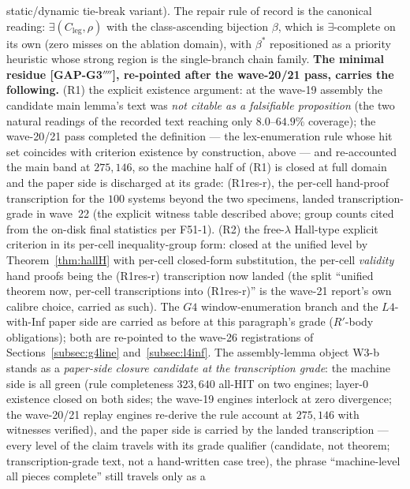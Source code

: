 static/dynamic tie-break variant). The repair rule of record is the canonical reading:
$\exists(C_{\mathrm{leg}},\rho)$ with the class-ascending bijection $\beta$, which is
$\exists$-complete on its own (zero misses on the ablation domain), with $\beta^\ast$
repositioned as a priority heuristic whose strong region is the single-branch chain
family. \textbf{The minimal residue \textup{[GAP-G3$''''$]}, re-pointed after the wave-20/21
pass, carries the following.} \textup{(R1)} the explicit existence argument: at the
wave-19 assembly the candidate main lemma's text was \emph{not citable as a falsifiable
proposition} (the two natural readings of the recorded text reaching only
$8.0$--$64.9\%$ coverage); the wave-20/21 pass completed the definition --- the
lex-enumeration rule whose hit set coincides with criterion existence by construction,
above --- and re-accounted the main band at $275{,}146$, so the machine half of
\textup{(R1)} is closed at full domain and the paper side is discharged at its grade:
\textup{(R1res-r)}, the per-cell hand-proof transcription for the $100$ systems beyond
the two specimens, landed transcription-grade in wave~22 (the explicit witness table
described above; group counts cited from the on-disk final statistics per F51-1).
\textup{(R2)} the free-$\lambda$ Hall-type explicit criterion in its per-cell
inequality-group form: closed at the unified level by Theorem~\ref{thm:hallH} with
per-cell closed-form substitution, the per-cell \emph{validity} hand proofs being the
\textup{(R1res-r)} transcription now landed (the split ``unified theorem now, per-cell
transcriptions into \textup{(R1res-r)}'' is the wave-21 report's own calibre choice,
carried as such). The $G4$ window-enumeration branch
and the $L4$-with-Inf paper side are carried as before at this paragraph's grade
($R'$-body obligations); both are re-pointed to the wave-26 registrations of
Sections~\ref{subsec:g4line} and~\ref{subsec:l4inf}. The assembly-lemma object W3-b stands as a \emph{paper-side closure
candidate at the transcription grade}: the machine side is all green (rule
completeness $323{,}640$ all-HIT on two engines; layer-$0$ existence closed on both
sides; the wave-19 engines interlock at zero divergence; the wave-20/21 replay engines
re-derive the rule account at $275{,}146$ with witnesses verified), and the paper side
is carried by the landed transcription --- every level of the claim travels with its
grade qualifier (candidate, not theorem; transcription-grade text, not a hand-written
case tree), the phrase ``machine-level all pieces complete'' still travels only as a
